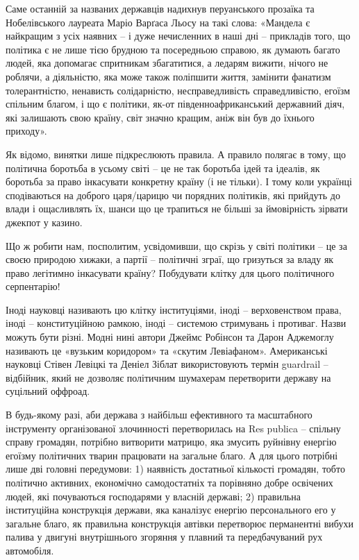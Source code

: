 Саме останній за названих державців надихнув перуанського прозаїка та
Нобелівського лауреата Маріо Варґаса Льосу на такі слова: «Мандела є найкращим
з усіх наявних – і дуже нечисленних в наші дні – прикладів того, що політика є
не лише тією брудною та посередньою справою, як думають багато людей, яка
допомагає спритникам збагатитися, а ледарям вижити, нічого не роблячи, а
діяльністю, яка може також поліпшити життя, замінити фанатизм толерантністю,
ненависть солідарністю, несправедливість справедливістю, егоїзм спільним
благом, і що є політики, як-от південноафриканський державний діяч, які
залишають свою країну, світ значно кращим, аніж він був до їхнього приходу».

Як відомо, винятки лише підкреслюють правила. А правило полягає в тому, що
політична боротьба в усьому світі – це не так боротьба ідей та ідеалів, як
боротьба за право інкасувати конкретну країну (і не тільки). І тому коли
українці сподіваються на доброго царя/царицю чи порядних політиків, які
прийдуть до влади і ощасливлять їх, шанси що це трапиться не більші за
ймовірність зірвати джекпот у казино.

Що ж робити нам, посполитим, усвідомивши, що скрізь у світі політики – це за
своєю природою хижаки, а партії – політичні зграї, що гризуться за владу як
право легітимно інкасувати країну? Побудувати клітку для цього політичного
серпентарію!

Іноді науковці називають цю клітку інституціями, іноді – верховенством права,
іноді – конституційною рамкою, іноді – системою стримувань і противаг. Назви
можуть бути різні. Модні нині автори Джеймс Робінсон та Дарон Аджемоглу
називають це «вузьким коридором» та «скутим Левіафаном». Американські науковці
Стівен Левіцкі та Деніел Зіблат використовують термін guardrail – відбійник,
який не дозволяє політичним шумахерам перетворити державу на суцільний оффроад.

В будь-якому разі, аби держава з найбільш ефективного та масштабного
інструменту організованої злочинності перетворилась на Res publica – спільну
справу громадян, потрібно витворити матрицю, яка змусить руйнівну енергію
егоїзму політичних тварин працювати на загальне благо. А для цього потрібні
лише дві головні передумови: 1) наявність достатньої кількості громадян, тобто
політично активних, економічно самодостатніх та порівняно добре освічених
людей, які почуваються господарями у власній державі; 2) правильна інституційна
конструкція держави, яка каналізує енергію персонального его у загальне благо,
як правильна конструкція автівки перетворює перманентні вибухи палива у двигуні
внутрішнього згоряння у плавний та передбачуваний рух автомобіля.

